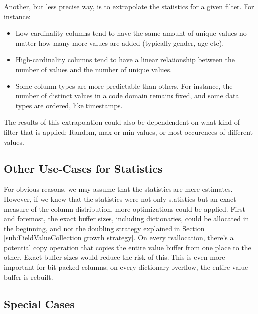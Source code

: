 Another, but less precise way, is to extrapolate the statistics for a given filter. For instance:
\begin{itemize}
    \item Low-cardinality columns tend to have the same amount of unique values no matter how many more values are added (typically gender, age etc).
    \item High-cardinality columns tend to have a linear relationship between the number of values and the number of unique values.
    \item Some column types are more predictable than others. For instance, the number of distinct values in a code domain remains fixed, and some data types are ordered, like timestamps. 
\end{itemize}
The results of this extrapolation could also be dependendent on what kind of filter that is applied: Random, max or min values, or most occurences of different values.

\subsection{Other Use-Cases for Statistics}
\label{sub:Other Use-Cases for Statistics}
For obvious reasons, we may assume that the statistics are mere estimates. However, if we knew that the statistics were not only statistics but an exact measure of the column distribution, more optimizations could be applied. First and foremost, the exact buffer sizes, including dictionaries, could be allocated in the beginning, and not the doubling strategy explained in Section \ref{sub:FieldValueCollection growth strategy}. On every reallocation, there's a potential copy operation that copies the entire value buffer from one place to the other. Exact buffer sizes would reduce the risk of this. This is even more important for bit packed columns; on every dictionary overflow, the entire value buffer is rebuilt. 

\subsection{Special Cases}
\label{sub:Special Cases}





